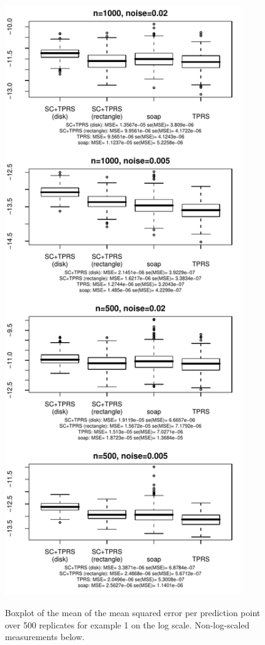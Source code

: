 \documentclass[a4paper,10pt]{amsart}
\begin{document}
\begin{figure}[p]
\centering
\includegraphics[width=4in]{figs-otherdomains/fig9-boxplot.pdf} \\
\caption{Boxplot of the mean of the mean squared error per prediction point over 500 replicates for example 1 on the log scale. Non-log-scaled measurements below.}
\label{fig9-boxplots}
\end{figure}
\end{document}
